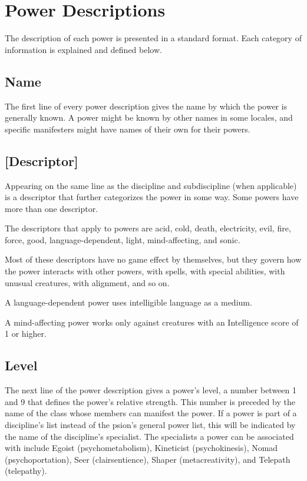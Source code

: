 \section{Power Descriptions}
The description of each power is presented in a standard format. Each category of information is explained and defined below.

\subsection{Name}
The first line of every power description gives the name by which the power is generally known. A power might be known by other names in some locales, and specific manifesters might have names of their own for their powers.



\subsection{[Descriptor]}
Appearing on the same line as the discipline and subdiscipline (when applicable) is a descriptor that further categorizes the power in some way. Some powers have more than one descriptor.

The descriptors that apply to powers are acid, cold, death, electricity, evil, fire, force, good, language-dependent, light, mind-affecting, and sonic.

Most of these descriptors have no game effect by themselves, but they govern how the power interacts with other powers, with spells, with special abilities, with unusual creatures, with alignment, and so on.

A language-dependent power uses intelligible language as a medium.

A mind-affecting power works only against creatures with an Intelligence score of 1 or higher.

\subsection{Level}
The next line of the power description gives a power's level, a number between 1 and 9 that defines the power's relative strength. This number is preceded by the name of the class whose members can manifest the power. If a power is part of a discipline's list instead of the psion's general power list, this will be indicated by the name of the discipline's specialist. The specialists a power can be associated with include Egoist (psychometabolism), Kineticist (psychokinesis), Nomad (psychoportation), Seer (clairsentience), Shaper (metacreativity), and Telepath (telepathy).


